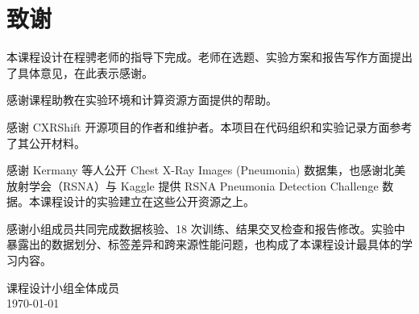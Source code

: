 \documentclass[12pt,a4paper,UTF8,openany]{ctexbook}
\begin{document}
\chapter*{致\quad 谢}

本课程设计在程骋老师的指导下完成。老师在选题、实验方案和报告写作方面提出了具体意见，在此表示感谢。

感谢课程助教在实验环境和计算资源方面提供的帮助。

感谢 CXRShift 开源项目的作者和维护者。本项目在代码组织和实验记录方面参考了其公开材料。

感谢 Kermany 等人公开 Chest X-Ray Images (Pneumonia) 数据集，也感谢北美放射学会（RSNA）与 Kaggle 提供 RSNA Pneumonia Detection Challenge 数据。本课程设计的实验建立在这些公开资源之上。

感谢小组成员共同完成数据核验、18 次训练、结果交叉检查和报告修改。实验中暴露出的数据划分、标签差异和跨来源性能问题，也构成了本课程设计最具体的学习内容。\vspace{1cm}

\begin{flushright}
课程设计小组全体成员 \\
\today
\end{flushright}
\end{document}
